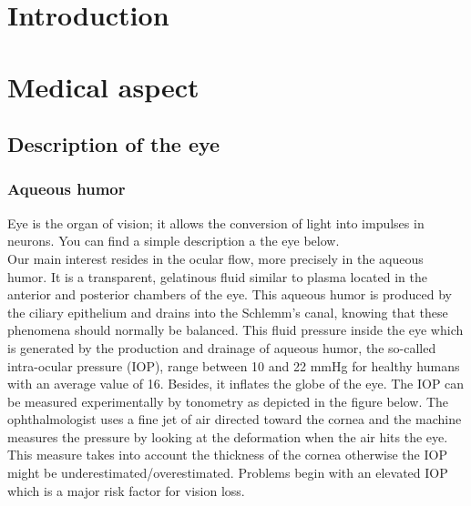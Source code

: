 \documentclass[english,12pt]{article}
\begin{document}
\vskip25mm
\section{Introduction}\label{S1}

\section{Medical aspect}\label{s2}
\subsection{Description of the eye}
\subsubsection{Aqueous humor }
Eye is the organ of vision; it allows the conversion of light into impulses in neurons. You can find a simple description a the eye below.\\
Our main interest resides in the ocular flow, more precisely in the aqueous humor. It is a transparent, gelatinous fluid similar to plasma located in the anterior and posterior chambers of the eye. This aqueous humor is produced by the ciliary epithelium and drains into the Schlemm's canal, knowing that these phenomena should normally be balanced.
This fluid pressure inside the eye which is generated by the production and drainage of aqueous humor, the so-called intra-ocular pressure (IOP), range between 10 and 22 mmHg for healthy humans with an average value of 16. Besides, it inflates the globe of the eye.
The IOP can be measured experimentally by tonometry as depicted in the figure below.
 The ophthalmologist uses a fine jet of air directed toward the cornea and the machine measures the pressure by looking at the deformation when the air hits the eye. This measure takes into account the thickness of the cornea otherwise the IOP might be underestimated/overestimated.
Problems begin with an elevated IOP which is a major risk factor for vision loss.
\end{document}
